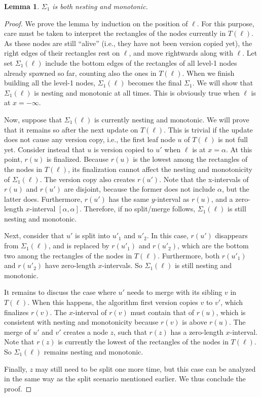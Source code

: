 \documentclass{sig-alternate}
\newtheorem{lemma}{Lemma}
\renewcommand{\(}{\left(}
\renewcommand{\)}{\right)}
\begin{document}
\begin{lemma} \label{lmm:topopen-level1}
	$\Sigma_1$ is both nesting and monotonic.
\end{lemma}
\begin{fullenv}
\begin{proof}
  We prove the lemma by induction on the position of $\ell$. For this purpose,
  care must be taken to interpret the rectangles of the nodes currently in
  $T(\ell)$.  As these nodes are still ``alive'' (i.e., they have not been
  version copied yet), the right edges of their rectangles rest on $\ell$, and
  move rightwards along with $\ell$. Let set $\Sigma_1(\ell)$ include the
  bottom edges of the rectangles of all level-1 nodes already spawned so far,
  counting also the ones in $T(\ell)$. When we finish building all the level-1
  nodes, $\Sigma_1(\ell)$ becomes the final $\Sigma_1$. We will show that
  $\Sigma_1(\ell)$ is nesting and monotonic at all times. This is obviously
  true when $\ell$ is at $x = -\infty$.

  Now, suppose that $\Sigma_1(\ell)$ is currently nesting and monotonic. We
  will prove that it remains so after the next update on $T(\ell)$. This is
  trivial if the update does not cause any version copy, i.e., the first leaf
  node $u$ of $T(\ell)$ is not full yet. Consider instead that $u$ is version
  copied to $u'$ when $\ell$ is at $x = \alpha$. At this point, $r(u)$ is
  finalized. Because $r(u)$ is the lowest among the rectangles of the nodes in
  $T(\ell)$, its finalization cannot affect the nesting and monotonicity of
  $\Sigma_1(\ell)$. The version copy also creates $r(u')$. Note that the
  x-intervals of $r(u)$ and $r(u')$ are disjoint, because the former does not
  include $\alpha$, but the latter does. Furthermore, $r(u')$ has the same
  $y$-interval as $r(u)$, and a zero-length $x$-interval $[\alpha, \alpha]$.
  Therefore, if no split/merge follows, $\Sigma_1(\ell)$ is still nesting and
  monotonic.

  Next, consider that $u'$ is split into $u'_1$ and $u'_2$. In this case,
  $r(u')$ disappears from $\Sigma_1(\ell)$, and is replaced by $r(u'_1)$ and
  $r(u'_2)$, which are the bottom two among the rectangles of the nodes in
  $T(\ell)$. Furthermore, both $r(u'_1)$ and $r(u'_2)$ have zero-length
  $x$-intervals. So $\Sigma_1(\ell)$ is still nesting and monotonic.

  It remains to discuss the case where $u'$ needs to merge with its sibling $v$
  in $T(\ell)$. When this happens, the algorithm first version copies $v$ to
  $v'$, which finalizes $r(v)$. The $x$-interval of $r(v)$ must contain that of
  $r(u)$, which is consistent with nesting and monotonicity because $r(v)$ is
  above $r(u)$. The merge of $u'$ and $v'$ creates a node $z$, such that $r(z)$
  has a zero-length $x$-interval. Note that $r(z)$ is currently the lowest of
  the rectangles of the nodes in $T(\ell)$. So $\Sigma_1(\ell)$ remains nesting
  and monotonic.

  Finally, $z$ may still need to be split one more time, but this case can be
  analyzed in the same way as the split scenario mentioned earlier. We thus
  conclude the proof.
\end{proof}
\end{fullenv}
\end{document}
